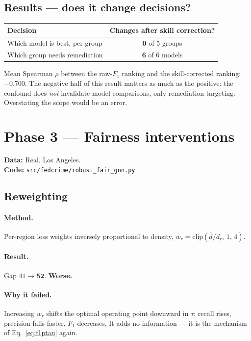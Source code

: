 \documentclass[11pt,a4paper]{article}
\newcommand{\datatag}[2]{%
  \begin{center}\small
  \colorbox{boxbg}{\parbox{0.965\linewidth}{\textbf{Data:} #1 \\ \textbf{Code:} \texttt{#2}}}
  \end{center}}
\newcommand{\verdictbad}[1]{\textcolor{dkred}{\textbf{#1}}}
\begin{document}
\subsection{Results --- does it change decisions?}
\begin{center}
\begin{tabular}{lc}
\toprule
Decision & Changes after skill correction? \\
\midrule
Which model is best, per group & $\mathbf{0}$ of $5$ groups \\
Which group needs remediation & $\mathbf{6}$ of $6$ models \\
\bottomrule
\end{tabular}
\end{center}
\noindent Mean Spearman $\rho$ between the raw-$F_1$ ranking and the
skill-corrected ranking: $\mathbf{-0.700}$. The negative half of this result
matters as much as the positive: the confound does \emph{not} invalidate model
comparisons, only remediation targeting. Overstating the scope would be an
error.

\section{Phase 3 --- Fairness interventions}\label{sec:interventions}
\datatag{Real. Los Angeles.}{src/fedcrime/robust\_fair\_gnn.py}

\subsection{Reweighting}
\paragraph{Method.} Per-region loss weights inversely proportional to density,
$w_r = \mathrm{clip}(\bar{d}/d_r,\,1,\,4)$.
\paragraph{Result.} Gap $41 \to \mathbf{52}$. \verdictbad{Worse.}
\paragraph{Why it failed.} Increasing $w_r$ shifts the optimal operating point
downward in $\tau$; recall rises, precision falls faster, $F_1$ decreases. It
adds no information --- it is the mechanism of Eq.~\eqref{eq:f1ptau} again.
\end{document}
